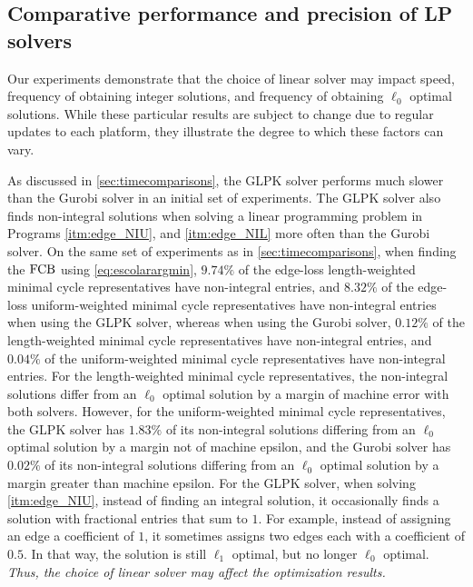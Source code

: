 
\subsection{Comparative performance and precision of LP solvers}\label{Computational cost of the various optimization techniques}

Our experiments demonstrate that the choice of linear solver may impact speed, frequency of obtaining integer solutions, and frequency of obtaining $\ell_0$ optimal solutions. While these particular results are subject to change due to regular updates to each platform, they illustrate the degree to which these factors can vary.  

As discussed in \se \ref{sec:timecomparisons}, the GLPK solver performs much slower than the Gurobi solver in an initial set of experiments. The GLPK solver also finds non-integral solutions when solving a linear programming problem in Programs
\ref{itm:edge_NIU}, and
\ref{itm:edge_NIL}
 more often than the Gurobi solver. On the same set of experiments as in \se \ref{sec:timecomparisons}, when finding the $\mathrm{FCB}$ using \pr \eqref{eq:escolarargmin}, $9.74\%$ of the edge-loss length-weighted minimal cycle representatives have non-integral entries, and $8.32\%$ of the edge-loss uniform-weighted minimal cycle representatives have non-integral entries when using the GLPK solver, whereas when using the Gurobi solver, $0.12\%$ of the length-weighted minimal cycle representatives have non-integral entries, and $0.04\%$ of the uniform-weighted minimal cycle representatives have non-integral entries. For the length-weighted minimal cycle representatives, the non-integral solutions differ from an $\ell_0$ optimal solution by a margin of machine error with both solvers. However, for the uniform-weighted minimal cycle representatives, the GLPK solver has $1.83\%$ of its non-integral solutions differing from an $\ell_0$ optimal solution by a margin not of machine epsilon, and the Gurobi solver has $0.02\%$ of its non-integral solutions differing from an $\ell_0$ optimal solution by a margin greater than machine epsilon. For the GLPK solver, when solving \pr
 \ref{itm:edge_NIU}, instead of finding an integral solution, it occasionally finds a solution with fractional entries that sum to $1$. For example, instead of assigning an edge a coefficient of $1$, it sometimes assigns two edges each with a coefficient of $0.5$. In that way, the solution is still $\ell_1$ optimal, but no longer $\ell_0$ optimal. \emph{Thus, the choice of linear solver may affect the optimization results.} 

